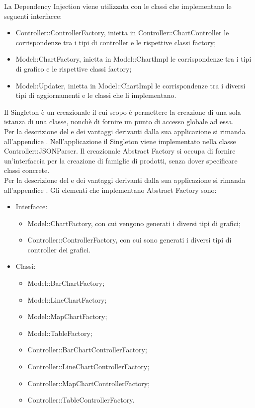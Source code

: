 	La Dependency Injection viene utilizzata con le classi che implementano le seguenti interfacce:
	\begin{itemize}
	\item Controller::ControllerFactory, inietta in Controller::ChartController le corrispondenze tra i tipi di controller e le rispettive classi factory;
	\item Model::ChartFactory, inietta in Model::ChartImpl le  corrispondenze tra i tipi di grafico e le rispettive classi factory;
	\item Model::Updater, inietta in Model::ChartImpl le corrispondenze tra i diversi tipi di aggiornamenti e le classi che li implementano.
	\end{itemize}
	Il Singleton è un  creazionale il cui scopo è permettere la creazione di una sola istanza di una classe, nonchè di fornire un punto di accesso globale ad essa.\\
	Per la descrizione del  e dei vantaggi derivanti dalla sua applicazione si rimanda all'appendice .
	Nell'applicazione  il Singleton viene implementato nella classe Controller::JSONParser.
	Il  creazionale Abstract Factory si occupa di fornire un'interfaccia per la creazione di famiglie di prodotti, senza dover specificare classi concrete. \\
	Per la descrizione del  e dei vantaggi derivanti dalla sua applicazione si rimanda all'appendice .
	Gli elementi che implementano Abstract Factory sono:
	\begin{itemize}
	\item Interfacce:
		\begin{itemize}
			\item Model::ChartFactory, con cui vengono generati i diversi tipi di grafici;
			\item Controller::ControllerFactory, con cui sono generati i diversi tipi di controller dei grafici.
		\end{itemize}
	\item Classi:
		\begin{itemize}
			\item Model::BarChartFactory;
			\item Model::LineChartFactory;
			\item Model::MapChartFactory;
			\item Model::TableFactory;
			\item Controller::BarChartControllerFactory;
			\item Controller::LineChartControllerFactory;
			\item Controller::MapChartControllerFactory;
			\item Controller::TableControllerFactory.
		\end{itemize}
	\end{itemize}
